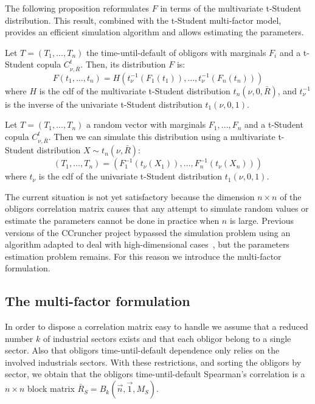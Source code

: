 \documentclass[11pt,fleqn]{book} %
\begin{document}
The following proposition reformulates $F$ in terms of the multivariate 
t-Student distribution. This result, combined with the t-Student multi-factor 
model, provides an efficient simulation algorithm and allows estimating the 
parameters.

\begin{proposition}
	\label{prop:dtd}
	Let $T=(T_1,\dots,T_n)$ the time-until-default of obligors with marginals 
	$F_i$ and a t-Student copula $C_{\nu,\bar{R}}^t$. Then, its distribution 
	$F$ is:
	\begin{displaymath}
		F(t_1,\dots,t_n) = H\left(t_\nu^{-1}(F_1(t_1)), \dots, t_\nu^{-1}(F_n(t_n))\right)
	\end{displaymath}
	where $H$ is the cdf of the multivariate t-Student distribution 
	$t_n(\nu,0,\bar{R})$, and $t_\nu^{-1}$ is the inverse of the univariate 
	t-Student distribution $t_1(\nu,0,1)$.
\end{proposition}

\begin{corollary}
	\label{cor:dts1}
	Let $T=(T_1, \dots, T_n)$ a random vector with marginals 
	$F_1, \dots, F_n$ and a t-Student copula $C_{\nu,\bar{R}}^t$. 
	Then we can simulate this distribution using a multivariate t-Student 
	distribution $X \sim t_n(\nu,\bar{R})$:
	\begin{displaymath}
		(T_1, \dots, T_n) = \left(F_1^{-1}\left(t_{\nu}(X_1)\right), \dots, F_n^{-1}\left(t_{\nu}(X_n)\right)\right)
	\end{displaymath}
	where $t_\nu$ is the cdf of the univariate t-Student distribution $t_1(\nu,0,1)$.
\end{corollary}

The current situation is not yet satisfactory because the dimension 
$n {\times} n$ of the obligors correlation matrix causes that any 
attempt to simulate random values or estimate the parameters cannot 
be done in practice when $n$ is large. 
Previous versions of the CCruncher project bypassed the simulation problem 
using an algorithm adapted to deal with high-dimensional 
cases~\cite{torrent:2012}, but the parameters estimation problem remains. 
For this reason we introduce the multi-factor formulation.

\subsection{The multi-factor formulation}

In order to dispose a correlation matrix easy to handle we assume that a 
reduced number $k$ of industrial sectors exists and that each obligor belong 
to a single sector. Also that obligors time-until-default dependence only 
relies on the involved industrials sectors. With these restrictions, and 
sorting the obligors by sector, we obtain that the obligors time-until-default
Spearman's correlation is a $n {\times} n$ block matrix 
$\bar{R}_S = B_k(\vec{n},\vec{1},M_S)$.
\end{document}
